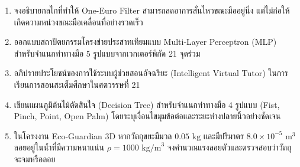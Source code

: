 \begin{enumerate}
    \item จงอธิบายกลไกที่ทำให้ One-Euro Filter สามารถลดอาการสั่นไหวขณะมืออยู่นิ่ง แต่ไม่ก่อให้เกิดความหน่วงขณะมือเคลื่อนที่อย่างรวดเร็ว
    \item ออกแบบสถาปัตยกรรมโครงข่ายประสาทเทียมแบบ Multi-Layer Perceptron (MLP) สำหรับจำแนกท่าทางมือ 5 รูปแบบจากเวกเตอร์พิกัด 21 จุดร่วม
    \item อภิปรายประโยชน์ของการใช้ระบบผู้ช่วยสอนอัจฉริยะ (Intelligent Virtual Tutor) ในการเรียนการสอนสะเต็มศึกษาในศตวรรษที่ 21
    \item เขียนแผนภูมิต้นไม้ตัดสินใจ (Decision Tree) สำหรับจำแนกท่าทางมือ 4 รูปแบบ (Fist, Pinch, Point, Open Palm) โดยระบุเงื่อนไขมุมข้อต่อและระยะห่างปลายนิ้วอย่างชัดเจน
    \item ในโครงงาน Eco-Guardian 3D หากวัตถุขยะมีมวล $0.05\text{ kg}$ และมีปริมาตร $8.0 \times 10^{-5}\text{ m}^3$ ลอยอยู่ในน้ำที่มีความหนาแน่น $\rho = 1000\text{ kg/m}^3$ จงคำนวณแรงลอยตัวและตรวจสอบว่าวัตถุจะจมหรือลอย
\end{enumerate}
